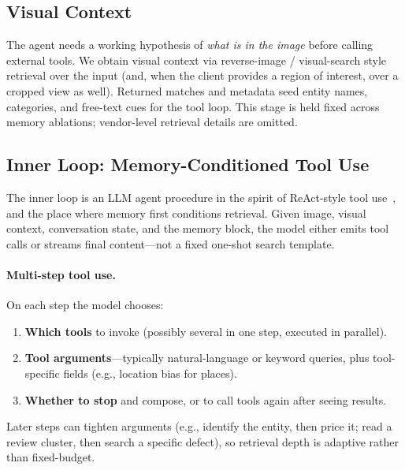 \documentclass[11pt,a4paper]{article}
\begin{document}
\subsection{Visual Context}

The agent needs a working hypothesis of \emph{what is in the image} before calling external tools. We obtain visual context via reverse-image / visual-search style retrieval over the input (and, when the client provides a region of interest, over a cropped view as well). Returned matches and metadata seed entity names, categories, and free-text cues for the tool loop. This stage is held fixed across memory ablations; vendor-level retrieval details are omitted.

\subsection{Inner Loop: Memory-Conditioned Tool Use}
\label{sec:tool_loop}

The inner loop is an LLM agent procedure in the spirit of ReAct-style tool use~\cite{react}, and the place where memory first conditions retrieval. Given image, visual context, conversation state, and the memory block, the model either emits tool calls or streams final content---not a fixed one-shot search template.

\paragraph{Multi-step tool use.}
On each step the model chooses:
\begin{enumerate}[leftmargin=*]
    \item \textbf{Which tools} to invoke (possibly several in one step, executed in parallel).
    \item \textbf{Tool arguments}---typically natural-language or keyword queries, plus tool-specific fields (e.g., location bias for places).
    \item \textbf{Whether to stop} and compose, or to call tools again after seeing results.
\end{enumerate}
Later steps can tighten arguments (e.g., identify the entity, then price it; read a review cluster, then search a specific defect), so retrieval depth is adaptive rather than fixed-budget.
\end{document}

